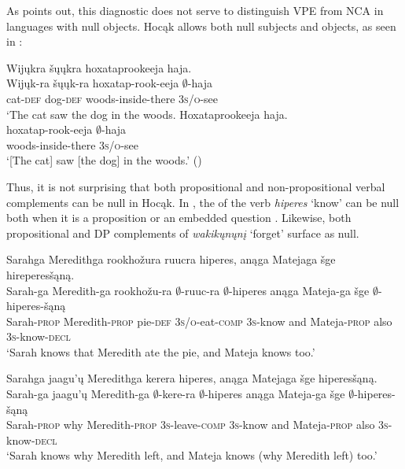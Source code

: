 \documentclass[output=paper]{LSP/langsci}
\begin{document}
 
As \citet{Fortin2007} points out, this diagnostic does not serve to distinguish VPE from NCA in languages with null objects. Hocąk allows both null subjects and objects, as seen in :
 

 
\ea
\ea 
\glll Wijųkra šųųkra hoxataprookeeja haja.\\
Wijųk-ra šųųk-ra hoxatap-rook-eeja $\emptyset$-haja\\
cat-\textsc{def} dog-\textsc{def} woods-inside-there \textsc{3s/o}-see\\
\trans `The cat saw the dog in the woods. 
\ex\label{ex:johnson:31b} 
\glll Hoxataprookeeja haja.\\
hoxatap-rook-eeja $\emptyset$-haja\\
woods-inside-there \textsc{3s/o}-see\\
\trans `[The cat] saw [the dog] in the woods.' (\citealt[7]{JohnsonEtAl2013b})
\z
\z


Thus, it is not surprising that both propositional and non-propositional verbal complements can be null in Hocąk. In , the  of the verb \emph{hiperes} `know' can be null both when it is a proposition  or an embedded question . Likewise, both propositional  and DP   complements of \emph{wakikųnųnį} `forget' surface as null.
 
\ea\label{ex:johnson:32}
\ea\label{ex:johnson:32a} 
\glll Sarahga Meredithga rookhožura ruucra hiperes, anąga Matejaga šge hireperesšąną.\\
Sarah-ga Meredith-ga rookhožu-ra $\emptyset$-ruuc-ra $\emptyset$-hiperes anąga Mateja-ga šge $\emptyset$-hiperes-šąną\\
Sarah-\textsc{prop} Meredith-\textsc{prop} pie-\textsc{def} \textsc{3s/o}-eat-\textsc{comp} \textsc{3s}-know and Mateja-\textsc{prop} also \textsc{3s}-know-\textsc{decl}\\
\trans `Sarah knows that Meredith ate the pie, and Mateja knows too.'
 
\ex\label{ex:johnson:32b} 
\glll Sarahga jaagu'ų Meredithga kerera hiperes, anąga Matejaga šge hiperesšąną.\\
Sarah-ga jaagu'ų Meredith-ga $\emptyset$-kere-ra $\emptyset$-hiperes anąga Mateja-ga šge $\emptyset$-hiperes-šąną\\
Sarah-\textsc{prop} why Meredith-\textsc{prop} \textsc{3s}-leave-\textsc{comp} \textsc{3s}-know and Mateja-\textsc{prop} also \textsc{3s}-know-\textsc{decl}\\
\trans `Sarah knows why Meredith left, and Mateja knows (why Meredith left) too.'
\z
\z
\end{document}
